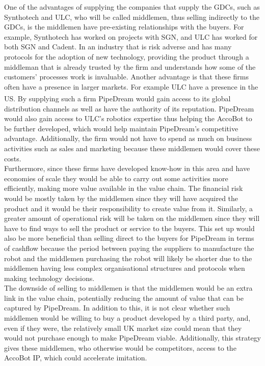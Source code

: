 \documentclass[11pt]{article}		%
\newcommand{\supercite}[1]{\textsuperscript{\cite{#1}}}		%
\begin{document}
    One of the advantages of supplying the companies that supply the GDCs, such as Synthotech and ULC, who will be called middlemen, thus selling indirectly to the GDCs, is the middlemen have pre-existing relationships with the buyers. For example, Synthotech has worked on projects with SGN, and ULC has worked for both SGN and Cadent. In an industry that is risk adverse and has many protocols for the adoption of new technology, providing the product through a middleman that is already trusted by the firm and understands how some of the customers’ processes work is invaluable. Another advantage is that these firms often have a presence in larger markets. For example ULC have a presence in the US\supercite{SPX_acquisition}. By supplying such a firm PipeDream would gain access to its global distribution channels as well as have the authority of its reputation. PipeDream would also gain access to ULC’s robotics expertise thus helping the AccoBot to be further developed, which would help maintain PipeDream's competitive advantage. Additionally, the firm would not have to spend as much on business activities such as sales and marketing because these middlemen would cover these costs.
    \\
    \hspace*{2ex}Furthermore, since these firms have developed know-how in this area and have economies of scale they would be able to carry out some activities more efficiently, making more value available in the value chain. The financial risk would be mostly taken by the middlemen since they will have acquired the product and it would be their responsibility to create value from it. Similarly, a greater amount of operational risk will be taken on the middlemen since they will have to find ways to sell the product or service to the buyers. This set up would also be more beneficial than selling direct to the buyers for PipeDream in terms of cashflow because the period between paying the suppliers to manufacture the robot and the middlemen purchasing the robot will likely be shorter due to the middlemen having less complex organisational structures and protocols when making technology decisions. 
    \\
    \hspace*{2ex}The downside of selling to middlemen is that the middlemen would be an extra link in the value chain, potentially reducing the amount of value that can be captured by PipeDream. In addition to this, it is not clear whether such middlemen would be willing to buy a product developed by a third party, and, even if they were, the relatively small UK market size could mean that they would not purchase enough to make PipeDream viable. Additionally, this strategy gives these middlemen, who otherwise would be competitors, access to the AccoBot IP, which could accelerate imitation.
\end{document}
